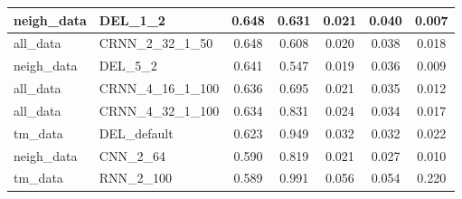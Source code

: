 \documentclass[thesis=M,english]{FITthesis}[2012/10/20]
\begin{document}
\begin{table}[H]
\begin{small}
\begin{tabular}{|l|l|c|c|c|c|c|}
neigh\_data & DEL\_1\_2 & 0.648 & 0.631 & 0.021 & 0.040 & 0.007 \tabularnewline  \hline 
all\_data & CRNN\_2\_32\_1\_50 & 0.648 & 0.608 & 0.020 & 0.038 & 0.018 \tabularnewline  \hline 
neigh\_data & DEL\_5\_2 & 0.641 & 0.547 & 0.019 & 0.036 & 0.009 \tabularnewline  \hline 
all\_data & CRNN\_4\_16\_1\_100 & 0.636 & 0.695 & 0.021 & 0.035 & 0.012 \tabularnewline  \hline 
all\_data & CRNN\_4\_32\_1\_100 & 0.634 & 0.831 & 0.024 & 0.034 & 0.017 \tabularnewline  \hline 
tm\_data & DEL\_default & 0.623 & 0.949 & 0.032 & 0.032 & 0.022 \tabularnewline  \hline 
neigh\_data & CNN\_2\_64 & 0.590 & 0.819 & 0.021 & 0.027 & 0.010 \tabularnewline  \hline 
tm\_data & RNN\_2\_100 & 0.589 & 0.991 & 0.056 & 0.054 & 0.220 \tabularnewline  \hline 
    \end{tabular}
\end{small}
\end{table}
\end{document}
